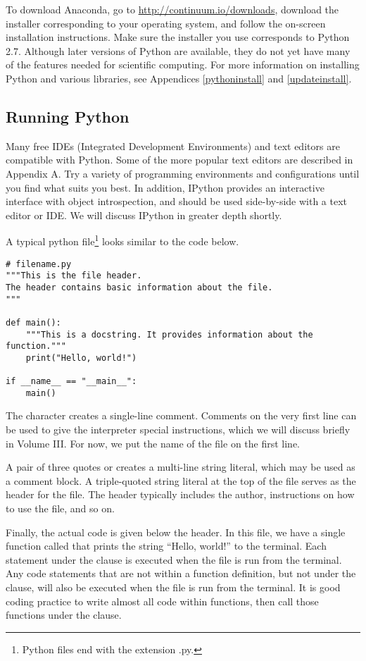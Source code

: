 To download Anaconda, go to \url{http://continuum.io/downloads}, download the installer corresponding to your operating system, and follow the on-screen installation instructions. 
Make sure the installer you use corresponds to Python 2.7.
Although later versions of Python are available, they do not yet have many of the features needed for scientific computing. %
For more information on installing Python and various libraries, see Appendices \ref{pythoninstall} and \ref{updateinstall}.

\subsection*{Running Python}

Many free IDEs (Integrated Development Environments) and text editors are compatible with Python.
Some of the more popular text editors are described in Appendix A.
Try a variety of programming environments and configurations until you find what suits you best.
In addition, IPython provides an interactive interface with object introspection, and should be used side-by-side with a text editor or IDE.
We will discuss IPython in greater depth shortly.

A typical python file\footnote{Python files end with the extension .py.} looks similar to the code below.

\begin{lstlisting}
# filename.py
"""This is the file header.
The header contains basic information about the file.
"""

def main():
    """This is a docstring. It provides information about the function."""
    print("Hello, world!")

if __name__ == "__main__":
    main()
\end{lstlisting}

The \li{#} character creates a single-line comment.
Comments on the very first line can be used to give the interpreter special instructions, which we will discuss briefly in Volume III.
For now, we put the name of the file on the first line. 

A pair of three quotes  or  creates a multi-line string literal, which may be used as a comment block.
A triple-quoted string literal at the top of the file serves as the header for the file.
The header typically includes the author, instructions on how to use the file, and so on.

Finally, the actual code is given below the header.
In this file, we have a single function called  that prints the string ``Hello, world!'' to the terminal.
Each statement under the  clause is executed when the file is run from the terminal.
Any code statements that are not within a function definition, but not under the  clause, will also be executed when the file is run from the terminal.
It is good coding practice to write almost all code within functions, then call those functions under the  clause.

